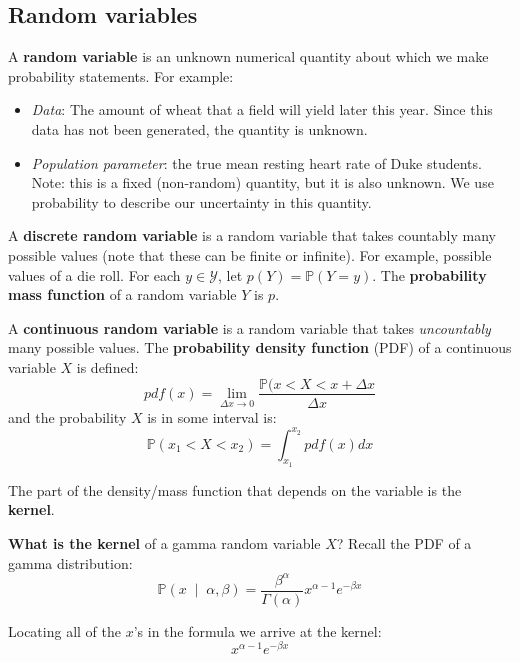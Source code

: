 \documentclass[titlepage, 12pt, leqno]{article}
\begin{document}
\subsection{Random variables}
\begin{definition}
    A \textbf{random variable} is an unknown numerical quantity about which we
    make probability statements. For example:
    \begin{itemize}
        \item \textit{Data}: The amount of wheat that a field will yield later
            this year. Since this data has not been generated, the quantity is 
            unknown.
        \item \textit{Population parameter}: the true mean resting heart rate of
            Duke students. Note: this is a fixed (non-random) quantity, but it is
            also unknown. We use probability to describe our uncertainty in this
            quantity.
    \end{itemize}
\end{definition}

\begin{definition}
    A \textbf{discrete random variable} is a random variable that takes
    countably many possible values (note that these can be finite or infinite).
    For example, possible values of a die roll.
    For each $y \in \mathcal{Y}$, let $p(Y) = \mathbb{P}(Y=y)$. The
    \textbf{probability mass function} of a random variable $Y$ is $p$.
\end{definition}

\begin{definition}
    A \textbf{continuous random variable} is a random variable that takes
    \textit{uncountably} many possible values. The \textbf{probability
    density function} (PDF) of a continuous variable $X$ is defined:
    \[
        pdf(x) = \lim_{\Delta x \to 0} 
        \frac{\mathbb{P}(x < X < x + \Delta x}{\Delta x}
    \]
    and the probability $X$ is in some interval is:
    \[
        \mathbb{P}(x_1<X<x_2) = \int_{x_1}^{x_2} pdf(x)dx
    \]
\end{definition}

\begin{definition}
    The part of the density/mass function that depends on the variable is the
    \textbf{kernel}.
\end{definition}

\begin{ex}
    \textbf{What is the kernel} of a gamma random variable $X$? Recall the PDF
    of a gamma distribution:
    \[
        \mathbb{P}\left(x \;\middle|\; \alpha, \beta\right) = \frac{
        \beta^{\alpha}}{\Gamma(\alpha)}x^{\alpha-1}e^{-\beta x}
    \]
    \vspace{10px}
    
    Locating all of the $x$'s in the formula we arrive at the kernel:
    \[
        \boxed{x^{\alpha-1}e^{-\beta x}} 
    \]
\end{ex}
\end{document}

